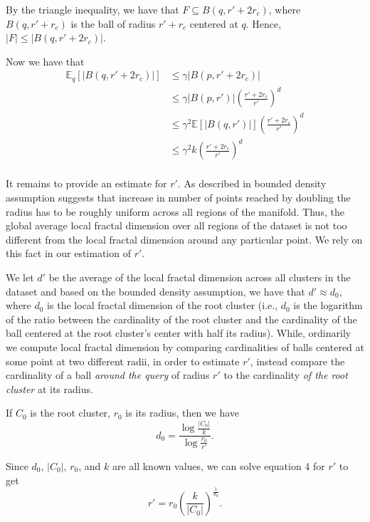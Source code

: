 By the triangle inequality, we have that $F \subseteq B(q, r' + 2r_c)$, 
where $B(q, r' + r_c)$ is the ball of radius $r' + r_c$ centered at $q$.
Hence, $|F| \leq |B(q, r' + 2r_c)|$.

Now we have that \begin{align*} \mathbb{E}_q[|B(q, r' + 2r_c)|] &\leq \gamma|B(p, r' + 2r_c)| \\ %
    &\leq \gamma|B(p, r')|\left(\frac{r' + 2r_c}{r'}\right)^d \label{5}\\ %
    &\leq \gamma^2 \mathbb{E}[|B(q, r')|]\left(\frac{r'+2r_c}{r'}\right)^d \\ %
    &\leq \gamma^2 k\left(\frac{r'+ 2r_c}{r'}\right)^d  \\   %
\end{align*}

It remains to provide an estimate for $r'$. As described in \cite{yu2015entropy} bounded density assumption suggests that increase in number of
points reached by doubling the radius has to be roughly uniform across all regions of the manifold. Thus, the global 
average local fractal dimension over all regions of the dataset is not too different from the local fractal dimension around any particular point.
We rely on this fact in our estimation of $r'$. 

We let $d'$ be the average of the local fractal dimension across all clusters in the dataset and based on the bounded density assumption, we have that
$d' \approx d_{0}$, where $d_0$ is the local fractal dimension of the root cluster (i.e., $d_0$ is the logarithm of the ratio between the cardinality of the root cluster 
and the cardinality of the ball centered at the root cluster's center with half its radius). While, ordinarily we compute local fractal dimension 
by comparing cardinalities of balls centered at some point at two different radii, in order to estimate $r'$, instead compare the cardinality of 
a ball \emph{around the query} of radius $r'$ to the cardinality \emph{of the root cluster} at its radius.

If $C_0$ is the root cluster, $r_0$ is its radius, then we have 
\begin{equation} d_0 = \frac{\log{}\frac{|C_0|}{k}}{\log{}\frac{r_0}{r'}}. \label{4} \end{equation}

Since $d_0$, $|C_0|$, $r_0$, and $k$ are all known values, we can solve equation 4 for $r'$ to get
\begin{equation} r' = r_0\left(\frac{k}{|C_0|}\right)^{\frac{1}{d_0}}. \label{6} \end{equation}
